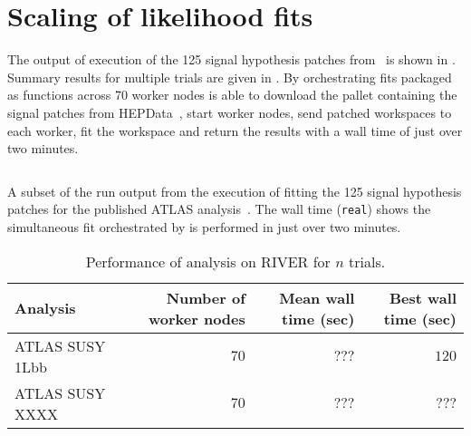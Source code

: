 \section{Scaling of likelihood fits}\label{sec:results}
%
The output of execution of the 125 signal hypothesis patches from~\cite{SUSY-2019-08} is shown in .
Summary results for multiple trials are given in .
By orchestrating \pyhf{} fits packaged as \funcX{} functions across 70 worker nodes \funcX{} is able to download the \pyhf{} pallet containing the signal patches from HEPData~\cite{ATLAS_SUSY_1Lbb_pallet}, start \funcX{} worker nodes, send patched workspaces to each worker, fit the workspace and return the results with a wall time of just over two minutes.
\\

\begin{listing}
 \inputminted{text}{src/code/funcX_demo_output.txt}
 \caption{A subset of the run output from the execution of fitting the 125 signal hypothesis patches for the published ATLAS analysis~\cite{SUSY-2019-08}.
 The wall time (\texttt{real}) shows the simultaneous fit orchestrated by \funcX{} is performed in just over two minutes.}
 \label{lst:funcX_demo_output}
\end{listing}

\begin{table}[htpb]
 \centering
 \caption{Performance of analysis on RIVER for $n$ trials.
 }
 \begin{tabular}{@{}lrrr@{}} \toprule
  Analysis        & Number of worker nodes & Mean wall time (sec) & Best wall time (sec)\\ \midrule
  ATLAS SUSY 1Lbb & $70$                   & $???$                & $120$\\
  ATLAS SUSY XXXX & $70$                   & $???$                & $???$\\
  \bottomrule
 \end{tabular}\label{table:performance}%
\end{table}


